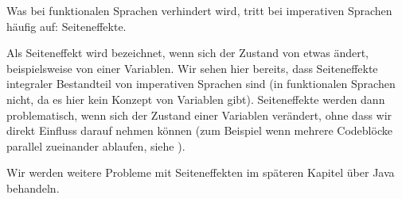 	Was bei funktionalen Sprachen verhindert wird, tritt bei imperativen Sprachen häufig auf: Seiteneffekte.
	
	Als Seiteneffekt wird bezeichnet, wenn sich der Zustand von etwas ändert, beispielsweise von einer Variablen. Wir sehen hier bereits, dass Seiteneffekte integraler Bestandteil von imperativen Sprachen sind (in funktionalen Sprachen nicht, da es hier kein Konzept von Variablen gibt). Seiteneffekte werden dann problematisch, wenn sich der Zustand einer Variablen verändert, ohne dass wir direkt Einfluss darauf nehmen können (zum Beispiel wenn mehrere Codeblöcke parallel zueinander ablaufen, siehe ).
	
	Wir werden weitere Probleme mit Seiteneffekten im späteren Kapitel über Java behandeln.
	
